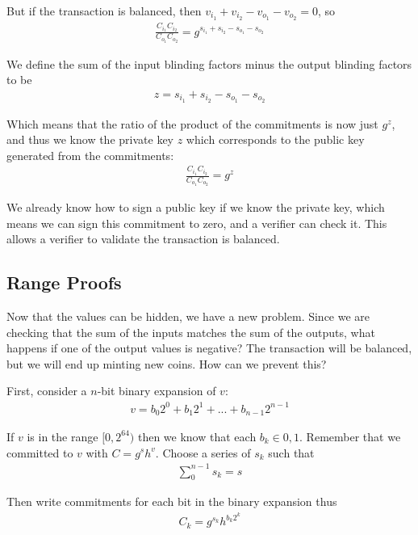 \documentclass{article}
\begin{document}
But if the transaction is balanced, then $v_{i_1} + v_{i_2} - v_{o_1} - v_{o_2} =0$, so
\begin{align}
  \frac{C_{i_1} C_{i_2}}{C_{o_1} C_{o_2}} = g^{s_{i_1} + s_{i_2} - s_{o_1} - s_{o_2}}
\end{align}

We define the sum of the input blinding factors minus the output blinding factors to be
\begin{align}
  z = s_{i_1} + s_{i_2} - s_{o_1} - s_{o_2}
\end{align}

Which means that the ratio of the product of the commitments is now just $g^z$, and thus we know the private key $z$ which corresponds to the public key generated from the commitments:
\begin{align}
  \frac{C_{i_1} C_{i_2}}{C_{o_1} C_{o_2}} = g^z
\end{align}

We already know how to sign a public key if we know the private key, which means we can sign this commitment to zero, and a verifier can check it.  This allows a verifier to validate the transaction is balanced.


\subsection{Range Proofs}

Now that the values can be hidden, we have a new problem.  Since we are checking that the sum of the inputs matches the sum of the outputs, what happens if one of the output values is negative?  The transaction will be balanced, but we will end up minting new coins.  How can we prevent this?

First, consider a $n$-bit binary expansion of $v$:
\begin{align}
  v = b_0 2^0 + b_1 2^1 + ... + b_{n-1} 2^{n-1}
\end{align}

If $v$ is in the range $[0, 2^{64})$ then we know that each $b_k \in {0, 1}$.  Remember that we committed to $v$ with $C = g^s h^v$.  Choose a series of $s_k$ such that
\begin{align}
  \sum_0^{n-1} s_k = s 
\end{align}

Then write commitments for each bit in the binary expansion thus
\begin{align}
  C_k = g^{s_k} h^{b_k 2^k}
\end{align}
\end{document}
